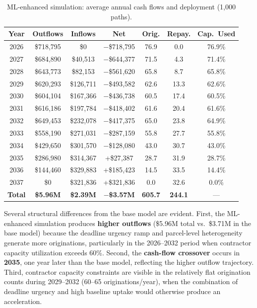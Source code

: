 \documentclass[11pt, letterpaper]{article}
\begin{document}
\begin{table}[H]
  \centering
  \caption{ML-enhanced simulation: average annual cash flows and deployment (1{,}000 paths).}
  \label{tab:ml_allocation}
  \begin{tabular}{@{}ccccccc@{}}
    \toprule
    \textbf{Year} & \textbf{Outflows} & \textbf{Inflows} & \textbf{Net} & \textbf{Orig.} & \textbf{Repay.} & \textbf{Cap.\ Used} \\
    \midrule
    2026 & \$718{,}795 & \$0 & $-$\$718{,}795 & 76.9 & 0.0 & 76.9\% \\
    2027 & \$684{,}890 & \$40{,}513 & $-$\$644{,}377 & 71.5 & 4.3 & 71.4\% \\
    2028 & \$643{,}773 & \$82{,}153 & $-$\$561{,}620 & 65.8 & 8.7 & 65.8\% \\
    2029 & \$620{,}293 & \$126{,}711 & $-$\$493{,}582 & 62.6 & 13.3 & 62.6\% \\
    2030 & \$604{,}104 & \$167{,}366 & $-$\$436{,}738 & 60.5 & 17.4 & 60.5\% \\
    2031 & \$616{,}186 & \$197{,}784 & $-$\$418{,}402 & 61.6 & 20.4 & 61.6\% \\
    2032 & \$649{,}453 & \$232{,}078 & $-$\$417{,}375 & 65.0 & 23.8 & 64.9\% \\
    2033 & \$558{,}190 & \$271{,}031 & $-$\$287{,}159 & 55.8 & 27.7 & 55.8\% \\
    2034 & \$429{,}650 & \$301{,}570 & $-$\$128{,}080 & 43.0 & 30.7 & 43.0\% \\
    2035 & \$286{,}980 & \$314{,}367 & +\$27{,}387 & 28.7 & 31.9 & 28.7\% \\
    2036 & \$144{,}460 & \$329{,}883 & +\$185{,}423 & 14.5 & 33.5 & 14.4\% \\
    2037 & \$0 & \$321{,}836 & +\$321{,}836 & 0.0 & 32.6 & 0.0\% \\
    \midrule
    \textbf{Total} & \textbf{\$5.96M} & \textbf{\$2.39M} & $-$\textbf{\$3.57M} & \textbf{605.7} & \textbf{244.1} & --- \\
    \bottomrule
  \end{tabular}
\end{table}

Several structural differences from the base model are evident. First, the ML-enhanced simulation produces \textbf{higher outflows} (\$5.96M total vs.\ \$3.71M in the base model) because the deadline urgency ramp and parcel-level heterogeneity generate more originations, particularly in the 2026--2032 period when contractor capacity utilization exceeds 60\%. Second, the \textbf{cash-flow crossover} occurs in \textbf{2035}, one year later than the base model, reflecting the higher outflow trajectory. Third, contractor capacity constraints are visible in the relatively flat origination counts during 2029--2032 (60--65 originations/year), when the combination of deadline urgency and high baseline uptake would otherwise produce an acceleration.
\end{document}
